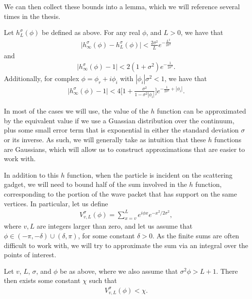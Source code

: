 \documentclass[../thesis-main/thesis-main]{subfiles}
\begin{document}
We can then collect these bounds into a lemma, which we will reference several times in the thesis.
\begin{lemma}
\label{lem:h_bounds}
  Let $h_L^\sigma(\phi)$ be defined as above.  For any real $\phi$, and $L>0$, we have that
  \begin{align}
    \big| h_\infty^\sigma(\phi) - h_L^\sigma(\phi)\big| < \frac{2\sigma^2}{L} e^{-\frac{L^2}{2\sigma^2}}\label{eq:hL_bound}
  \end{align}
  and
  \begin{align}
    \big|h_\infty^\sigma(\phi) - 1\big| < 2(1 + \sigma^2) e^{-\frac{1}{2\sigma^2}}\label{eq:h_infinity_bound}.
  \end{align}
  Additionally, for complex $\phi = \phi_r + i \phi_i$ with $|\phi_i|\sigma^2 < 1$, we have that
  \begin{align}
    \big| h_\infty^\sigma(\phi) - 1\big| < 4 \bigg[1 + \frac{\sigma^2}{1 - \sigma^2 |\phi_i|} \bigg]e^{-\frac{1}{2\sigma^2} + |\phi_i|}\label{eq:h_complex_bound}.
  \end{align}
\end{lemma}

In most of the cases we will use, the value of the $h$ function can be approximated by the equivalent value if we use a Guassian distribution over the continuum, plus some small error term that is exponential in either the standard deviation $\sigma$ or its inverse.  As such, we will generally take as intuition that these $h$ functions are Gaussians, which will allow us to construct approximations that are easier to work with.




In addition to this $h$ function, when the particle is incident on the scattering gadget, we will need to bound half of the sum involved in the $h$ function, corresponding to the portion of the wave packet that has support on the same vertices.  In particular, let us define
\begin{align}
  V_{v,L}^{\sigma}(\phi) = \sum_{x=v}^L e^{i\phi x} e^{- x^2/2\sigma^2},
\end{align}
where $v,L$ are integers larger than zero, and let us assume that $\phi \in (-\pi,-\delta) \cup (\delta, \pi)$, for some constant $\delta>0$. As the finite sums are often difficult to work with, we will try to approximate the sum via an integral over the points of interest. 
\begin{lemma}
  Let $v$, $L$, $\sigma$, and $\phi$ be as above, where we also assume that $\sigma^2 \phi > L+1$.  There then exists some constant $\chi$ such that
  \begin{align}
    V_{v,L}^\sigma(\phi) < \chi.
  \end{align}
\label{lem:tail_bounds}
\end{lemma}
\end{document}

